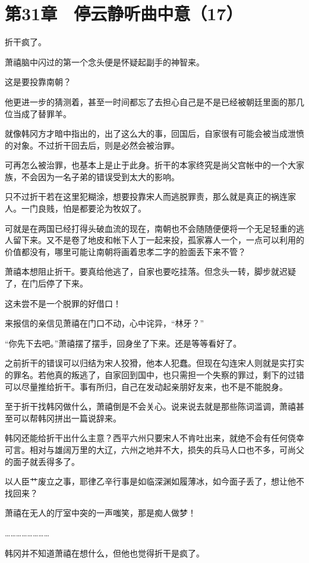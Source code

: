 \section{第31章　停云静听曲中意（17）}

折干疯了。

萧禧脑中闪过的第一个念头便是怀疑起副手的神智来。

这是要投靠南朝？

他更进一步的猜测着，甚至一时间都忘了去担心自己是不是已经被朝廷里面的那几位当成了替罪羊。

就像韩冈方才暗中指出的，出了这么大的事，回国后，自家很有可能会被当成泄愤的对象。不过折干回去后，则是必然会被治罪。

可再怎么被治罪，也基本上是止于此身。折干的本家终究是尚父宫帐中的一个大家族，不会因为一名子弟的错误受到太大的影响。

只不过折干若在这里犯糊涂，想要投靠宋人而逃脱罪责，那么就是真正的祸连家人。一门良贱，怕是都要沦为牧奴了。

可就是在两国已经打得头破血流的现在，南朝也不会随随便便将一个无足轻重的逃人留下来。又不是卷了地皮和帐下人丁一起来投，孤家寡人一个，一点可以利用的价值都没有，哪里可能让南朝将画着忠孝二字的脸面丢下来不管？

萧禧本想阻止折干。要真给他逃了，自家也要吃挂落。但念头一转，脚步就迟疑了，在门后停了下来。

这未尝不是一个脱罪的好借口！

来报信的亲信见萧禧在门口不动，心中诧异，“林牙？”

“你先下去吧。”萧禧摆了摆手，回身坐了下来。还是等等看好了。

之前折干的错误可以归结为宋人狡猾，他本人犯蠢。但现在勾连宋人则就是实打实的罪名。若他真的叛逃了，自家回到国中，也只需担一个失察的罪过，剩下的过错可以尽量推给折干。事有所归，自己在发动起亲朋好友来，也不是不能脱身。

至于折干找韩冈做什么，萧禧倒是不会关心。说来说去就是那些陈词滥调，萧禧甚至可以帮韩冈拼出一篇说辞来。

韩冈还能给折干出什么主意？西平六州只要宋人不肯吐出来，就绝不会有任何侥幸可言。相对与雄阔万里的大辽，六州之地并不大，损失的兵马人口也不多，可尚父的面子就丢得多了。

以人臣艹废立之事，耶律乙辛行事是如临深渊如履薄冰，如今面子丢了，想让他不找回来？

萧禧在无人的厅室中突的一声嗤笑，那是痴人做梦！

……………………

韩冈并不知道萧禧在想什么，但他也觉得折干是疯了。

